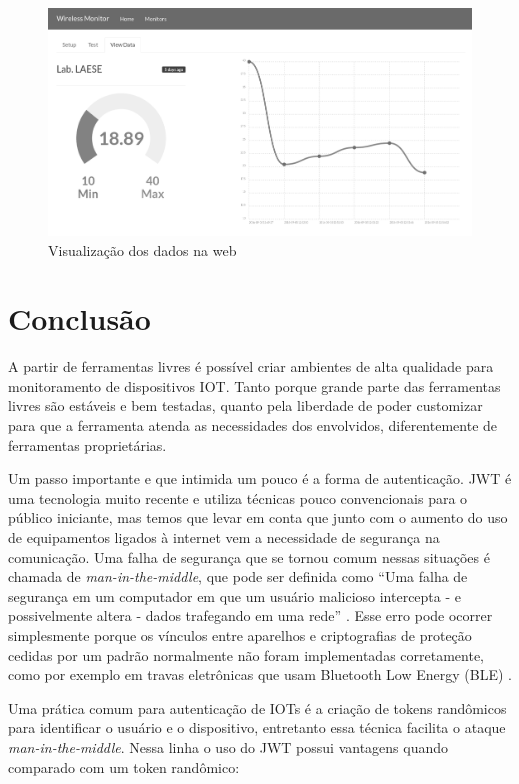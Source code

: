 \begin{figure}[h]
    \centering
    \includegraphics[scale=0.35]{img/temperature-show-grey.png}
    \caption{Visualização dos dados na web} \label{fig:view-monitor}
\end{figure}

\section{Conclusão}\label{conclusuxe3o}

A partir de ferramentas livres é possível criar ambientes de alta
qualidade para monitoramento de dispositivos IOT. Tanto porque grande
parte das ferramentas livres são estáveis e bem testadas, quanto pela
liberdade de poder customizar para que a ferramenta atenda as
necessidades dos envolvidos, diferentemente de ferramentas
proprietárias.

Um passo importante e que intimida um pouco é a forma de autenticação.
JWT é uma tecnologia muito recente e utiliza técnicas pouco
convencionais para o público iniciante, mas temos que levar em conta que
junto com o aumento do uso de equipamentos ligados à internet vem a
necessidade de segurança na comunicação. Uma falha de segurança que se
tornou comum nessas situações é chamada de \emph{man-in-the-middle}, que
pode ser definida como ``Uma falha de segurança em um computador em que
um usuário malicioso intercepta - e possivelmente altera - dados
trafegando em uma rede'' \cite{wordspy:2002}. Esse erro pode ocorrer
simplesmente porque os vínculos entre aparelhos e criptografias de
proteção cedidas por um padrão normalmente não foram implementadas
corretamente, como por exemplo em travas eletrônicas que usam Bluetooth
Low Energy (BLE) \cite{spring:2016}.

Uma prática comum para autenticação de IOTs é a criação de tokens
randômicos para identificar o usuário e o dispositivo, entretanto essa
técnica facilita o ataque \emph{man-in-the-middle}. Nessa linha o uso do
JWT possui vantagens quando comparado com um token randômico:

